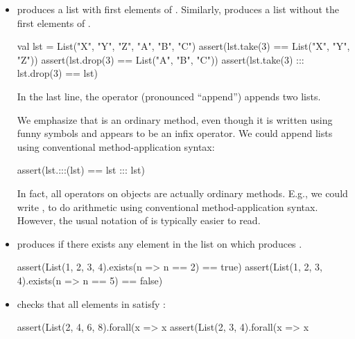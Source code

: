 \documentclass{book}
\begin{document}
\begin{itemize}

  \item {} produces a list with first 
  elements of . Similarly,  produces
  a list without the first  elements of .
  \begin{scalacode}
  val lst = List("X", "Y", "Z", "A", "B", "C")
  assert(lst.take(3) == List("X", "Y", "Z"))
  assert(lst.drop(3) == List("A", "B", "C"))
  assert(lst.take(3) ::: lst.drop(3) == lst)
  \end{scalacode}

  In the last line, the \scalainline{:::} operator (pronounced ``append'')
  appends two lists.

  \begin{notation}
  We emphasize that \scalainline{:::} is an ordinary method,
  even though it is written using funny symbols and appears to be an infix
  operator. We could append lists using conventional method-application
  syntax:
  \begin{scalacode}
  assert(lst.:::(lst) == lst ::: lst)
  \end{scalacode}
  In fact, all operators on objects are actually ordinary methods. E.g.,
  we could write , to do arithmetic using
  conventional method-application syntax. However, the usual notation
  of  is typically easier to read.

  \end{notation}

  \item {} produces  if there
  exists any element in the list on which  produces
  .

  \begin{scalacode}
  assert(List(1, 2, 3, 4).exists(n => n == 2) == true)
  assert(List(1, 2, 3, 4).exists(n => n == 5) == false)
  \end{scalacode}

  \item {} checks that all elements in 
  satisfy :
  \begin{scalacode}
  assert(List(2, 4, 6, 8).forall(x => x %
  assert(List(2, 3, 4).forall(x => x %
  \end{scalacode}

\end{itemize}
\end{document}
